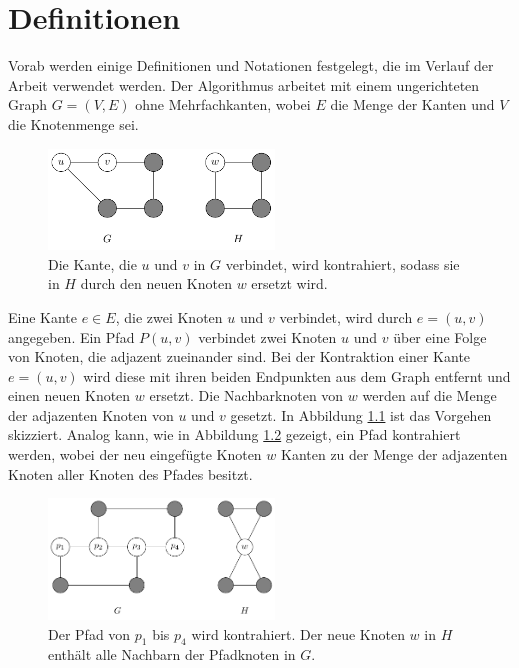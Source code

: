 \chapter{Definitionen}
\label{cha:definitionen}

Vorab werden einige Definitionen und Notationen festgelegt, die im Verlauf der Arbeit verwendet werden.
Der Algorithmus arbeitet mit einem ungerichteten Graph $G = (V, E)$ ohne Mehrfachkanten, wobei $E$ die Menge der Kanten und $V$ die Knotenmenge sei.
\begin{figure}
  \includegraphics[width=6cm]{bilder/Kantenkontraktion.pdf}
  \caption{Die Kante, die $u$ und $v$ in $G$ verbindet, wird kontrahiert, sodass sie in $H$ durch den neuen Knoten $w$ ersetzt wird.}
  \label{fig:Kantenkontraktion}
\end{figure}
Eine Kante $e \in E$, die zwei Knoten $u$ und $v$ verbindet, wird durch $e = (u, v)$ angegeben.
Ein Pfad $P(u, v)$ verbindet zwei Knoten $u$ und $v$ über eine Folge von Knoten, die adjazent zueinander sind.
Bei der Kontraktion einer Kante $e = (u, v)$ wird diese mit ihren beiden Endpunkten aus dem Graph entfernt und einen neuen Knoten $w$ ersetzt.
Die Nachbarknoten von $w$ werden auf die Menge der adjazenten Knoten von $u$ und $v$ gesetzt.
In Abbildung \ref{fig:Kantenkontraktion} ist das Vorgehen skizziert.
Analog kann, wie in Abbildung \ref{fig:Pfadkontraktion} gezeigt, ein Pfad kontrahiert werden, wobei der neu eingefügte Knoten $w$ Kanten zu der Menge der adjazenten Knoten aller Knoten des Pfades besitzt.
\begin{figure}
  \includegraphics[width=6cm]{bilder/Pfadkontraktion.pdf}
  \caption{Der Pfad von $p_1$ bis $p_4$ wird kontrahiert.
           Der neue Knoten $w$ in $H$ enthält alle Nachbarn der Pfadknoten in $G$.}
  \label{fig:Pfadkontraktion}
\end{figure}

